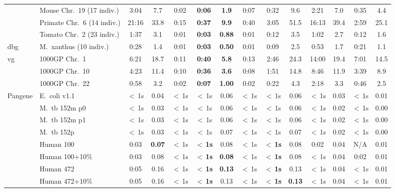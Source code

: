 \begin{table}[ht]
\begin{adjustbox}{max width=\linewidth}
\begin{tabular}{l l c c c c c c c c c c c c}
 & \textsf{Mouse Chr.~19 (17 indiv.)} & 3:04 & 7.7 & 0:02 & \textbf{0:06} & \textbf{1.9} & 0:07 & 0:32 & 9.6 & 2:21 & 7.0 & 0:35 & 4.4 \\
 & \textsf{Primate Chr.~6 (14 indiv.)} & 21:16 & 33.8 & 0:15 & \textbf{0:37} & \textbf{9.9} & 0:40 & 3:05 & 51.5 & 16:13 & 39.4 & 2:59 & 25.1 \\
 & \textsf{Tomato Chr.~2 (23 indiv.)} & 1:37 & 3.1 & 0:01 & \textbf{0:03} & \textbf{0.88} & 0:01 & 0:12 & 3.5 & 1:02 & 2.7 & 0:12 & 1.6 \\
\hline
\multirow{1}{*}{\textsf{dbg}} & \textsf{M.~xanthus (10 indiv.)} & 0:28 & 1.4 & 0:01 & \textbf{0:03} & \textbf{0.50} & 0:01 & 0:09 & 2.5 & 0:53 & 1.7 & 0:21 & 1.1 \\
\hline
\multirow{3}{*}{\textsf{vg}} & \textsf{1000GP Chr.~1} & 6:21 & 18.7 & 0:11 & \textbf{0:40} & \textbf{5.8} & 0:13 & 2:46 & 24.3 & 14:00 & 19.4 & 7:01 & 14.5 \\
 & \textsf{1000GP Chr.~10} & 4:23 & 11.4 & 0:10 & \textbf{0:36} & \textbf{3.6} & 0:08 & 1:51 & 14.8 & 8:46 & 11.9 & 3:39 & 8.9 \\
 & \textsf{1000GP Chr.~22} & 0:58 & 3.2 & 0:02 & \textbf{0:07} & \textbf{1.00} & 0:02 & 0:22 & 4.3 & 2:18 & 3.3 & 0:46 & 2.5 \\
\hline
\multirow{8}{*}{\textsf{Pangene}} & \textsf{E.~coli v1.1} & $<$\,1s & 0.04 & $<$\,1s & $<$\,1s & 0.06 & $<$\,1s & $<$\,1s & 0.06 & $<$\,1s & 0.03 & $<$\,1s & 0.01 \\
 & \textsf{M.~tb 152m p0} & $<$\,1s & 0.03 & $<$\,1s & $<$\,1s & 0.06 & $<$\,1s & $<$\,1s & 0.06 & $<$\,1s & 0.02 & $<$\,1s & 0.00 \\
 & \textsf{M.~tb 152m p1} & $<$\,1s & 0.03 & $<$\,1s & $<$\,1s & 0.06 & $<$\,1s & $<$\,1s & 0.06 & $<$\,1s & 0.02 & $<$\,1s & 0.00 \\
 & \textsf{M.~tb 152p} & $<$\,1s & 0.03 & $<$\,1s & $<$\,1s & 0.07 & $<$\,1s & $<$\,1s & 0.07 & $<$\,1s & 0.02 & $<$\,1s & 0.00 \\
 & \textsf{Human 100} & 0:03 & \textbf{0.07} & $<$\,1s & \textbf{$<$\,1s} & 0.08 & $<$\,1s & \textbf{$<$\,1s} & 0.08 & 0:02 & 0.04 & N/A & 0.01 \\
 & \textsf{Human 100+10\%} & 0:03 & 0.08 & $<$\,1s & \textbf{$<$\,1s} & \textbf{0.08} & $<$\,1s & \textbf{$<$\,1s} & 0.08 & $<$\,1s & 0.04 & 0:02 & 0.01 \\
 & \textsf{Human 472} & 0:05 & 0.16 & $<$\,1s & \textbf{$<$\,1s} & \textbf{0.13} & $<$\,1s & \textbf{$<$\,1s} & 0.13 & $<$\,1s & 0.04 & $<$\,1s & 0.01 \\
 & \textsf{Human 472+10\%} & 0:05 & 0.16 & $<$\,1s & \textbf{$<$\,1s} & 0.13 & $<$\,1s & \textbf{$<$\,1s} & \textbf{0.13} & $<$\,1s & 0.04 & $<$\,1s & 0.01 \\
\hline
\end{tabular}
\end{adjustbox}
\end{table}

